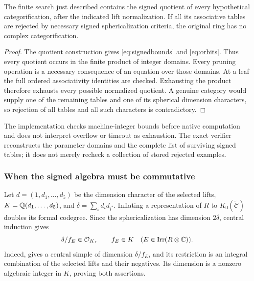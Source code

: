 \begin{proposition}\label{prop:oriented}
The finite search just described contains the signed quotient of every
hypothetical categorification, after the indicated lift normalization.
If all its associative tables are rejected by necessary signed
sphericalization criteria, the original ring has no complex
categorification.
\end{proposition}
\begin{proof}
The quotient construction gives \eqref{eq:signedbounds} and
\eqref{eq:orbits}. Thus every quotient occurs in the finite product of
integer domains. Every pruning operation is a necessary consequence of
an equation over those domains. At a leaf the full ordered associativity
identities are checked. Exhausting the product therefore exhausts every
possible normalized quotient. A genuine category would supply one of
the remaining tables and one of its spherical dimension characters, so
rejection of all tables and all such characters is contradictory.
\end{proof}

The implementation checks machine-integer bounds before native
computation and does not interpret overflow or timeout as exhaustion.
The exact verifier reconstructs the parameter domains and the complete
list of surviving signed tables; it does not merely recheck a collection
of stored rejected examples.

\subsubsection{When the signed algebra must be commutative}
Let $d=(1,d_1,\ldots,d_5)$ be the dimension character of the selected
lifts, $K=\mathbb Q(d_1,\ldots,d_5)$, and
$\delta=\sum_i d_i d_{i^*}$. Inflating a representation of $R$ to
$K_0(\widetilde{\mathcal C})$ doubles its formal codegree. Since the
sphericalization has dimension $2\delta$, central induction gives
\begin{equation}\label{eq:fieldconstraint}
 \delta/f_E\in\mathcal O_K,\qquad f_E\in K
 \quad(E\in\operatorname{Irr}(R\otimes\mathbb C)).
\end{equation}
Indeed, \cite[Theorem~2.13]{Ostrik3} gives a central simple of dimension
$\delta/f_E$, and its restriction is an integral combination of the
selected lifts and their negatives. Its dimension is a nonzero algebraic
integer in $K$, proving both assertions.


